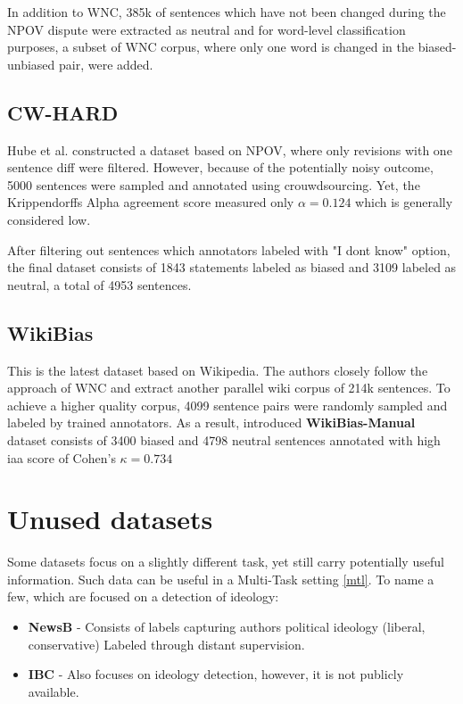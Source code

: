 In addition to WNC, 385k of sentences which have not been changed during the NPOV dispute were extracted as neutral and for word-level classification purposes, a subset of WNC corpus, where only one word is changed in the biased-unbiased pair, were added.




\subsection{CW-HARD}
Hube et al. \cite{hube2019neural} constructed a dataset based on NPOV, where only revisions with one sentence diff were filtered. However, because of the potentially noisy outcome, 5000 sentences were sampled and annotated using crouwdsourcing. Yet, the Krippendorffs Alpha agreement score measured only $\alpha = 0.124$ which is generally considered low. 

After filtering out sentences which annotators labeled with "I dont know" option, the final dataset consists of 1843 statements labeled as biased and 3109 labeled as neutral, a total of 4953 sentences.




\subsection{WikiBias}
This is the latest dataset based on Wikipedia. The authors \cite{zhong-etal-2021-wikibias-detecting} closely follow the approach of WNC \cite{pryzant2020automatically} and extract another parallel wiki corpus of 214k sentences.
To achieve a higher quality corpus, 4099 sentence pairs were randomly sampled and labeled by trained annotators. As a result, introduced \textbf{WikiBias-Manual} dataset consists of 3400 biased and 4798 neutral sentences annotated with high \gls{iaa} score of Cohen's $\kappa = 0.734$





\section{Unused datasets}
 Some datasets focus on a slightly different task, yet still carry potentially useful information. Such data can be useful in a Multi-Task setting \ref{mtl}. To name a few, which are focused on a detection of ideology:
\begin{itemize}
\item \textbf{NewsB} - 
Consists of labels capturing authors political ideology (liberal, conservative) Labeled through distant supervision.
\item \textbf{IBC} - Also focuses on ideology detection, however, it is not publicly available.
\end{itemize}


